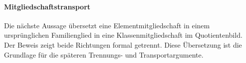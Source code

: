 \documentclass[main.tex]{subfiles}
\begin{document}
\paragraph{Mitgliedschaftstransport}

Die nächste Aussage übersetzt eine Elementmitgliedschaft in einem
ursprünglichen Familienglied in eine Klassenmitgliedschaft im Quotientenbild.
Der Beweis zeigt beide Richtungen formal getrennt. Diese Übersetzung ist die
Grundlage für die späteren Trennungs- und Transportargumente.

\end{document}
